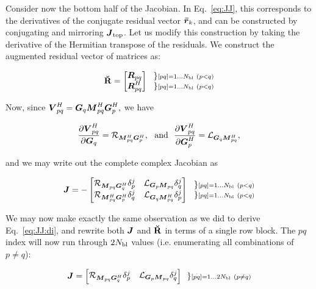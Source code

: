 \documentclass[useAMS,usenatbib]{mn2e}
\newcommand{\rrc}{\bmath{\bar r}}
\newcommand{\mat}[1]{{\bmath{#1}}}
\newcommand{\JJ}{\mat{J}} %
\newcommand{\MM}{\mat{M}}
\newcommand{\RR}{\mat{R}}
\newcommand{\VV}{\mat{V}}
\newcommand{\GG}{\mat{G}}
\begin{document}
Consider now the bottom half of the Jacobian. In Eq.~\ref{eq:JJ}, this corresponds to the derivatives of the conjugate residual
vector $\rrc_k$, and can be constructed by conjugating and mirroring $\JJ_\mathrm{top}$. Let us modify this construction 
by taking the derivative of the Hermitian transpose of the residuals. We construct the augmented residual vector of matrices
as:

\begin{equation}
\RRr = 
\Matrix{c}{
  \RR_{pq} \\ 
  \RR^H_{pq} 
} 
~~ 
\Stack{ 
\} \scriptstyle [pq]=1\dots \Nbl~(p<q) \\ 
\} \scriptstyle [pq]=1\dots \Nbl~(p<q) 
}
\label{eq:RRtranspose}
\end{equation}


Now, since $\VV^H_{pq}=\GG_q \MM^H_{pq} \GG^H_p,$ we have

\begin{equation}
\label{eq:dRH:dG}
\frac{\partial\VV^H_{pq}}{\partial\GG_q} = \Rop{\MM^H_{pq}\GG^H_p},\mathrm{~~and~~}
\frac{\partial\VV^H_{pq}}{\partial\GG^H_p} = \Lop{\GG_q \MM^H_{pq}},
\end{equation}

and we may write out the complete complex Jacobian as

\[
\JJ = - \Matrix{cc}{ 
\Rop{ \MM_{pq}\GG^H_q }\delta^j_p & 
\Lop{ \GG_p \MM_{pq}  }\delta^j_q \\
\Rop{ \MM^H_{pq} \GG^H_p } \delta^j_q & 
\Lop{ \GG_q \MM^H_{pq}  } \delta^j_p  
}~~ 
\Stack{ 
\} \scriptstyle [pq]=1\dots \Nbl~(p<q) \\ 
\} \scriptstyle [pq]=1\dots \Nbl~(p<q) 
}
\]

We may now make exactly the same observation as we did to derive Eq.~\ref{eq:JJ:di}, and rewrite both $\JJ$ and $\mathbf{\breve{R}}$ in terms of 
a single row block. The $pq$ index will now run through $2N_\mathrm{bl}$ values (i.e. enumerating all combinations of $p\ne q$):

\begin{equation}
\label{eq:JJ:pol}
\JJ = \Matrix{cc}{ 
\Rop{ \MM_{pq}\GG^H_q }\delta^j_p & 
\Lop{ \GG_p \MM_{pq}  }\delta^j_q \\
}~~ 
\} \scriptstyle [pq]=1\dots 2\Nbl~(p\ne q)\\ 
\end{equation}
\end{document}
